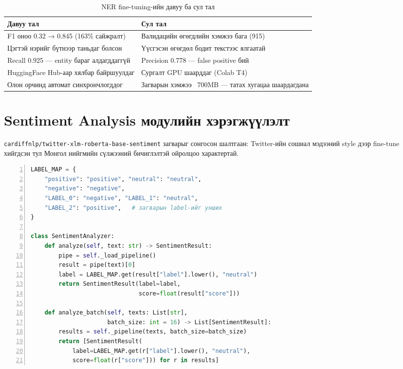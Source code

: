 \begin{table}[h!]
\centering
\renewcommand{\arraystretch}{1.4}
\begin{tabular}{|p{6cm}|p{6cm}|}
\hline
\textbf{Давуу тал} & \textbf{Сул тал} \\ \hline
F1 оноо 0.32 → 0.845 (163\% сайжралт) & Валидацийн өгөгдлийн хэмжээ бага (915) \\ \hline
Цэгтэй нэрийг бүтнээр таньдаг болсон & Үүсгэсэн өгөгдөл бодит текстээс ялгаатай \\ \hline
Recall 0.925 — entity бараг алдагддаггүй & Precision 0.778 — false positive бий \\ \hline
HuggingFace Hub-аар хялбар байршуулдаг & Сургалт GPU шаарддаг (Colab T4) \\ \hline
Олон орчинд автомат синхрончлогддог & Загварын хэмжээ ~700MB — татах хугацаа шаардагдана \\ \hline
\end{tabular}
\caption{NER fine-tuning-ийн давуу ба сул тал}
\label{tab:finetuning_pros_cons}
\end{table}

\section{Sentiment Analysis модулийн хэрэгжүүлэлт}

\texttt{cardiffnlp/twitter-xlm-roberta-base-sentiment} загварыг сонгосон шалтгаан: Twitter-ийн сошиал мэдээний style дээр fine-tune хийгдсэн тул Монгол нийгмийн сүлжээний бичиглэлтэй ойролцоо характертай.

\begin{lstlisting}[language=Python, caption={SentimentAnalyzer — label mapping ба batch}, basicstyle=\small\ttfamily, breaklines=true, frame=single, numbers=left]
LABEL_MAP = {
    "positive": "positive", "neutral": "neutral",
    "negative": "negative",
    "LABEL_0": "negative", "LABEL_1": "neutral",
    "LABEL_2": "positive",   # загварын label-ийг унших
}

class SentimentAnalyzer:
    def analyze(self, text: str) -> SentimentResult:
        pipe = self._load_pipeline()
        result = pipe(text)[0]
        label = LABEL_MAP.get(result["label"].lower(), "neutral")
        return SentimentResult(label=label,
                               score=float(result["score"]))

    def analyze_batch(self, texts: List[str],
                      batch_size: int = 16) -> List[SentimentResult]:
        results = self._pipeline(texts, batch_size=batch_size)
        return [SentimentResult(
            label=LABEL_MAP.get(r["label"].lower(), "neutral"),
            score=float(r["score"])) for r in results]
\end{lstlisting}

